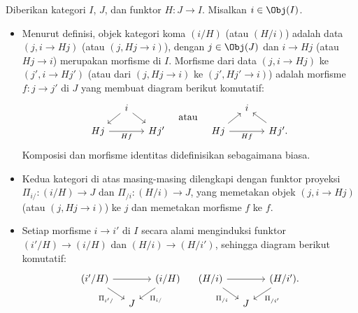 \begin{definisi}\label{def:comma-category}
	Diberikan kategori $I$, $J$, dan funktor $H: J \to I$. Misalkan
	$i \in \Obj(I)$.
	\begin{itemize}
		\item Menurut definisi, objek kategori koma $(i/H)$ (atau $(H/i)$)
		adalah data $(j, i \to Hj)$ (atau $(j, Hj \to i)$), dengan
		$j \in \Obj(J)$ dan $i \to Hj$ (atau $Hj \to i$) merupakan morfisme
		di $I$. Morfisme dari data $(j, i \to Hj)$ ke
		$(j', i \to Hj')$ (atau dari $(j, Hj \to i)$ ke
		$(j', Hj' \to i)$) adalah morfisme $f: j \to j'$ di $J$ yang membuat
		diagram berikut komutatif:
		\[\begin{tikzcd}[row sep=small, column sep=small]
			& i \arrow[ld] \arrow[rd] & \\
			Hj \arrow[rr, "{Hf}"'] & & Hj'
		\end{tikzcd} \quad \text{atau} \quad \begin{tikzcd}[row sep=small, column sep=small]
			& i & \\
			Hj \arrow[ru] \arrow[rr, "{Hf}"'] & & Hj' \arrow[lu] .
		\end{tikzcd}\]
		Komposisi dan morfisme identitas didefinisikan sebagaimana biasa.
		\item Kedua kategori di atas masing-masing dilengkapi dengan funktor
		proyeksi $\Pi_{i/}: (i/H) \to J$ dan $\Pi_{/i}: (H/i) \to J$, yang
		memetakan objek $(j, i \to Hj)$ (atau $(j, Hj \to i)$) ke $j$ dan
		memetakan morfisme $f$ ke $f$.
		\item Setiap morfisme $i \to i'$ di $I$ secara alami menginduksi funktor
		$(i'/H) \to (i/H)$ dan $(H/i) \to (H/i')$, sehingga diagram berikut
		komutatif:
		\[\begin{tikzcd}[column sep=small, row sep=small]
			(i'/H) \arrow[rr] \arrow[rd, "{\Pi_{i'/}}"'] & & (i/H) \arrow[ld, "{\Pi_{i/}}"] \\
			& J &
		\end{tikzcd} \quad \begin{tikzcd}[column sep=small, row sep=small]
			(H/i) \arrow[rr] \arrow[rd, "{\Pi_{/i}}"'] & & (H/i') \arrow[ld, "{\Pi_{/i'}}"] . \\
			& J &
		\end{tikzcd}\]
	\end{itemize}
\end{definisi}


